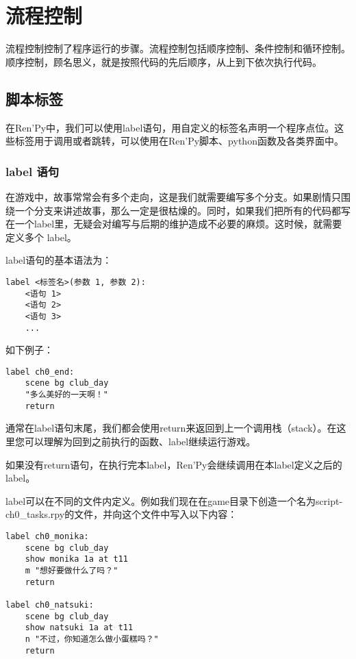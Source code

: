 \section{流程控制}
流程控制控制了程序运行的步骤。流程控制包括顺序控制、条件控制和循环控制。顺序控制，顾名思义，就是按照代码的先后顺序，从上到下依次执行代码。

\subsection{脚本标签}
在Ren'Py中，我们可以使用label语句，用自定义的标签名声明一个程序点位。这些标签用于调用或者跳转，可以使用在Ren'Py脚本、python函数及各类界面中。

\subsubsection{label 语句}
在游戏中，故事常常会有多个走向，这是我们就需要编写多个分支。如果剧情只围绕一个分支来讲述故事，那么一定是很枯燥的。同时，如果我们把所有的代码都写在一个label里，无疑会对编写与后期的维护造成不必要的麻烦。这时候，就需要定义多个 label。

label语句的基本语法为：
\begin{lstlisting}
label <标签名>(参数 1, 参数 2):
    <语句 1>
    <语句 2>
    <语句 3>
    ...
\end{lstlisting}

如下例子：
\begin{lstlisting}
label ch0_end:
    scene bg club_day
    "多么美好的一天啊！"
    return
\end{lstlisting}

\begin{Warning}
    通常在label语句末尾，我们都会使用return来返回到上一个调用栈（stack）。在这里您可以理解为回到之前执行的函数、label继续运行游戏。

    如果没有return语句，在执行完本label，Ren'Py会继续调用在本label定义之后的label。
\end{Warning}

label可以在不同的文件内定义。例如我们现在在game目录下创造一个名为script-ch0\_tasks.rpy的文件，并向这个文件中写入以下内容：
\begin{lstlisting}[caption=script-ch0\_tasks.rpy]
label ch0_monika:
    scene bg club_day
    show monika 1a at t11
    m "想好要做什么了吗？"
    return

label ch0_natsuki:
    scene bg club_day
    show natsuki 1a at t11
    n "不过，你知道怎么做小蛋糕吗？"
    return
\end{lstlisting}

